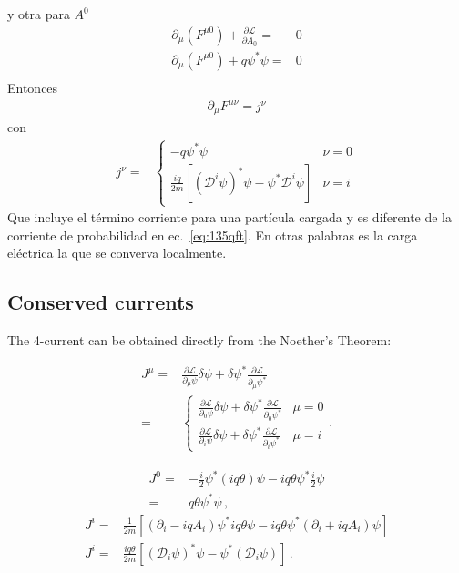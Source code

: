 y otra para $A^0$
\begin{align}
    \partial_\mu(F^{\mu0})+\frac{\partial\mathcal{L}}{\partial A_0}=&0\nonumber\\
    \partial_\mu(F^{\mu0})+q \psi^*\psi =&0\nonumber\\
\end{align}
Entonces
\begin{align*}
\partial_\mu F^{\mu\nu}=j^\nu
\end{align*}
con
\begin{align}
  \label{eq:85qft}
  j^\nu=&
  \begin{cases}
    -q \psi^*\psi &\nu=0\\
    \frac{i q}{2m}[ (\mathcal{D}^i\psi)^*\psi -\psi^*\mathcal{D}^i\psi ]&\nu=i
  \end{cases}
\end{align}
Que incluye el término corriente para una partícula cargada y es diferente de la corriente de probabilidad en ec.~\eqref{eq:135qft}. En otras palabras es la carga eléctrica la que se converva localmente. 

\subsection{Conserved currents}
The 4-current can be obtained directly from the Noether's Theorem:

\begin{align}
  J^\mu=&\frac{\partial\mathcal{L}}{\partial_\mu\psi}\delta\psi+\delta\psi^*\frac{\partial\mathcal{L}}{\partial_\mu\psi^*}\nonumber\\
=&\begin{cases}
  \frac{\partial\mathcal{L}}{\partial_0\psi}\delta\psi+\delta\psi^*\frac{\partial\mathcal{L}}{\partial_0\psi^*}&\mu=0\\
  \frac{\partial\mathcal{L}}{\partial_i\psi}\delta\psi+\delta\psi^*\frac{\partial\mathcal{L}}{\partial_i\psi^*}&\mu=i
\end{cases}.
\end{align}

\begin{align}
  J^0=&-\frac{i}{2}\psi^*(iq\theta)\psi-iq\theta\psi^*\frac{i}{2}\psi\nonumber\\
  =&q\theta\psi^*\psi\,,
\end{align}
\begin{align}
  J^i=&\frac{1}{2m}\left[\left(\partial_i-iqA_i\right)\psi^*iq\theta\psi-iq\theta\psi^*\left(\partial_i+iqA_i\right)\psi\right]\nonumber\\
  J^i=&\frac{iq\theta}{2m}\left[\left(\mathcal{D}_i\psi\right)^*\psi-\psi^*\left(\mathcal{D}_i\psi\right)\right]\,.
  \end{align}

